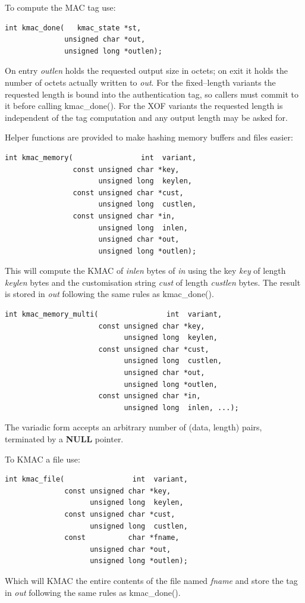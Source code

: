 \documentclass[synpaper]{book}
\begin{document}
To compute the MAC tag use:
\begin{verbatim}
int kmac_done(   kmac_state *st,
              unsigned char *out,
              unsigned long *outlen);
\end{verbatim}
On entry \textit{outlen} holds the requested output size in octets; on exit it holds the number of octets
actually written to \textit{out}. For the fixed--length variants the requested length is bound into the
authentication tag, so callers must commit to it before calling kmac\_done(). For the XOF variants the
requested length is independent of the tag computation and any output length may be asked for.

Helper functions are provided to make hashing memory buffers and files easier:
\begin{verbatim}
int kmac_memory(                int  variant,
                const unsigned char *key,
                      unsigned long  keylen,
                const unsigned char *cust,
                      unsigned long  custlen,
                const unsigned char *in,
                      unsigned long  inlen,
                      unsigned char *out,
                      unsigned long *outlen);
\end{verbatim}
This will compute the KMAC of \textit{inlen} bytes of \textit{in} using the key \textit{key} of length
\textit{keylen} bytes and the customisation string \textit{cust} of length \textit{custlen} bytes. The result
is stored in \textit{out} following the same rules as kmac\_done().

\begin{verbatim}
int kmac_memory_multi(                int  variant,
                      const unsigned char *key,
                            unsigned long  keylen,
                      const unsigned char *cust,
                            unsigned long  custlen,
                            unsigned char *out,
                            unsigned long *outlen,
                      const unsigned char *in,
                            unsigned long  inlen, ...);
\end{verbatim}
The variadic form accepts an arbitrary number of (data, length) pairs, terminated by a \textbf{NULL} pointer.

To KMAC a file use:
\begin{verbatim}
int kmac_file(                int  variant,
              const unsigned char *key,
                    unsigned long  keylen,
              const unsigned char *cust,
                    unsigned long  custlen,
              const          char *fname,
                    unsigned char *out,
                    unsigned long *outlen);
\end{verbatim}
Which will KMAC the entire contents of the file named \textit{fname} and store the tag in \textit{out}
following the same rules as kmac\_done().
\end{document}
